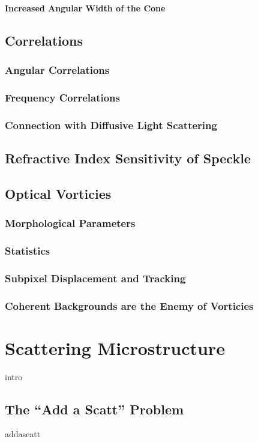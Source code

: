 \documentclass[a4paper,titlepage,onecolumn]{report}
\begin{document}
   \subsubsection{Increased Angular Width of the Cone}
 \section{Correlations}
  \subsection{Angular Correlations}
  \subsection{Frequency Correlations}
  \subsection{Connection with Diffusive Light Scattering}
 \section{Refractive Index Sensitivity of Speckle}
 \section{Optical Vorticies}
  \subsection{Morphological Parameters}
  \subsection{Statistics}
  \subsection{Subpixel Displacement and Tracking}
  \subsection{Coherent Backgrounds are the Enemy of Vorticies}

\chapter{Scattering Microstructure} \label{ch:scatteringmicro}
{intro}
 \section{The ``Add a Scatt'' Problem}
 {addascatt}
\end{document}
